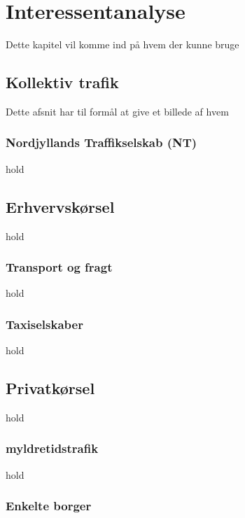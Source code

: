 
\chapter{Interessentanalyse}

Dette kapitel vil komme ind på hvem der kunne bruge 

\section{Kollektiv trafik}

Dette afsnit har til formål at give et billede af hvem

\subsection{Nordjyllands Traffikselskab (NT)}

hold

\section{Erhvervskørsel}

hold

\subsection{Transport og fragt}

hold

\subsection{Taxiselskaber}

hold

\section{Privatkørsel}

hold

\subsection{myldretidstrafik}

hold

\subsection{Enkelte borger}

